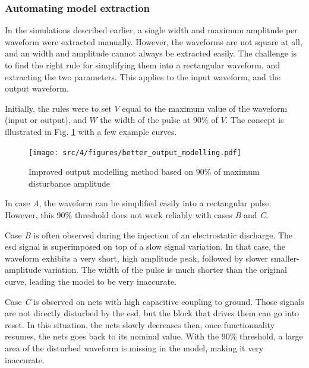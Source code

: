 \subsubsection{Automating model extraction}

In the simulations described earlier, a single width and maximum amplitude per waveform were extracted manually.
However, the waveforms are not square at all, and an width and amplitude cannot always be extracted easily.
The challenge is to find the right rule for simplifying them into a rectangular waveform, and extracting the two parameters.
This applies to the input waveform, and the output waveform.

Initially, the rules were to set $V$ equal to the maximum value of the waveform (input or output), and $W$ the width of the pulse at 90\% of $V$.
The concept is illustrated in Fig. \ref{fig:impact-single-failure-criteria} with a few example curves.

\begin{figure}[!h]
  \centering
  \texttt{[image: src/4/figures/better\_output\_modelling.pdf]}
  \caption{Improved output modelling method based on 90\% of maximum disturbance amplitude}
  \label{fig:impact-single-failure-criteria}
\end{figure}

In case \textit{A}, the waveform can be simplified easily into a rectangular pulse.
However, this 90\% threshold does not work reliably with cases \textit{B} and \textit{C}.

Case \textit{B} is often observed during the injection of an electrostatic discharge.
The \gls{esd} signal is superimposed on top of a slow signal variation.
In that case, the waveform exhibits a very short, high amplitude peak, followed by slower smaller-amplitude variation.
The width of the pulse is much shorter than the original curve, leading the model to be very inaccurate.

Case \textit{C} is observed on nets with high capacitive coupling to ground.
Those signals are not directly disturbed by the \gls{esd}, but the block that drives them can go into reset.
In this situation, the nets slowly decreases then, once functionnality resumes, the nets goes back to its nominal value.
With the 90\% threshold, a large area of the disturbed waveform is missing in the model, making it very inaccurate.

